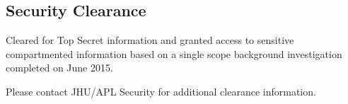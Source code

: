 \subsection*{Security Clearance}
{}
Cleared for Top Secret information and granted access to sensitive compartmented information based on a single scope background investigation completed on June 2015.

Please contact JHU/APL Security for additional clearance information.
